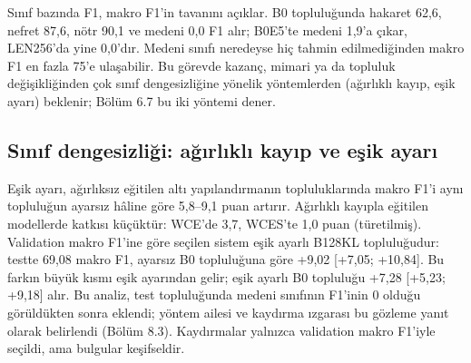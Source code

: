 \documentclass[11pt]{article}
\begin{document}
Sınıf bazında F1, makro F1'in tavanını açıklar. B0 topluluğunda hakaret 62,6, nefret 87,6, nötr 90,1 ve medeni 0,0 F1 alır; B0E5'te medeni 1,9'a çıkar, LEN256'da yine 0,0'dır. Medeni sınıfı neredeyse hiç tahmin edilmediğinden makro F1 en fazla 75'e ulaşabilir. Bu görevde kazanç, mimari ya da topluluk değişikliğinden çok sınıf dengesizliğine yönelik yöntemlerden (ağırlıklı kayıp, eşik ayarı) beklenir; Bölüm 6.7 bu iki yöntemi dener.

\subsection{Sınıf dengesizliği: ağırlıklı kayıp ve eşik ayarı}

Eşik ayarı, ağırlıksız eğitilen altı yapılandırmanın topluluklarında makro F1'i aynı topluluğun ayarsız hâline göre 5,8–9,1 puan artırır. Ağırlıklı kayıpla eğitilen modellerde katkısı küçüktür: WCE'de 3,7, WCES'te 1,0 puan (türetilmiş). Validation makro F1'ine göre seçilen sistem eşik ayarlı B128KL topluluğudur: testte 69,08 makro F1, ayarsız B0 topluluğuna göre +9,02 [+7,05; +10,84]. Bu farkın büyük kısmı eşik ayarından gelir; eşik ayarlı B0 topluluğu +7,28 [+5,23; +9,18] alır. Bu analiz, test topluluğunda medeni sınıfının F1'inin 0 olduğu görüldükten sonra eklendi; yöntem ailesi ve kaydırma ızgarası bu gözleme yanıt olarak belirlendi (Bölüm 8.3). Kaydırmalar yalnızca validation makro F1'iyle seçildi, ama bulgular keşifseldir.
\end{document}
